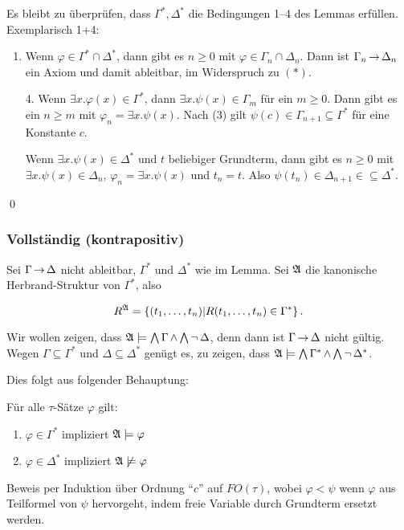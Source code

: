 Es bleibt zu überprüfen, dass $\Gamma^*,\Delta^*$ die Bedingungen 1--4
des Lemmas erfüllen. Exemplarisch 1+4:

\begin{enumerate}
  \item Wenn $\varphi\in\Gamma^*\cap\Delta^*$, dann gibt es $n\geq 0$ mit
  $\varphi\in\Gamma_n\cap\Delta_n$. Dann ist $\Gamma_n\operatorname{\rightarrow}\Delta_n$ ein
  Axiom und damit ableitbar, im Widerspruch zu $(*)$.
  
  \item[4.] Wenn $\exists x.\varphi(x)\in\Gamma^*$, dann
  $\exists x.\psi(x)\in\Gamma_m$ für ein $m\geq 0$. Dann gibt es ein
  $n\geq m$ mit $\varphi_n=\exists x.\psi(x)$. Nach (3) gilt
  $\psi(c)\in\Gamma_{n+1}\subseteq\Gamma^*$ für eine Konstante $c$.
  
  Wenn $\exists x.\psi(x)\in\Delta^*$ und $t$ beliebiger Grundterm, dann
  gibt es $n\geq 0$ mit $\exists x.\psi(x)\in\Delta_n$,
  $\varphi_n=\exists x.\psi(x)$ und $t_n=t$. Also
  $\psi(t_n)\in\Delta_{n+1}\in\subseteq\Delta^*$.
\end{enumerate}
\qed

\subsubsection{Vollständig (kontrapositiv)}

Sei $\Gamma\operatorname{\rightarrow}\Delta$ nicht ableitbar, $\Gamma^*$ und $\Delta^*$ wie
im Lemma. Sei $\mathfrak{A}$ die kanonische Herbrand-Struktur von $\Gamma^*$,
also

\[
  R^{\mathfrak{A}} = \left\{(t_1,\dots,t_n) | R(t_1,\dots,t_n)\in\Gamma^*\right\}.
\]

Wir wollen zeigen, dass $\mathfrak{A}\models\operatorname*{\bigwedge}\Gamma \operatorname{\wedge} \operatorname*{\bigwedge}\operatorname{\neg}\Delta$,
denn dann ist $\Gamma\operatorname{\rightarrow}\Delta$ nicht gültig. Wegen $\Gamma\subseteq\Gamma^*$
und $\Delta\subseteq\Delta^*$ genügt es, zu zeigen, dass
$\mathfrak{A}\models\operatorname*{\bigwedge}\Gamma^* \operatorname{\wedge} \operatorname*{\bigwedge} \operatorname{\neg}\Delta^*$.

Dies folgt aus folgender Behauptung:

Für alle $\tau$-Sätze $\varphi$ gilt:

\begin{enumerate}
  \item $\varphi\in\Gamma^*$ impliziert $\mathfrak{A}\models\varphi$
  \item $\varphi\in\Delta^*$ impliziert $\mathfrak{A}\not\models\varphi$
\end{enumerate}
  
Beweis per Induktion über Ordnung \enquote{$c$} auf $FO(\tau)$, wobei
$\varphi<\psi$ wenn $\varphi$ aus Teilformel von $\psi$ hervorgeht, indem
freie Variable durch Grundterm ersetzt werden.

